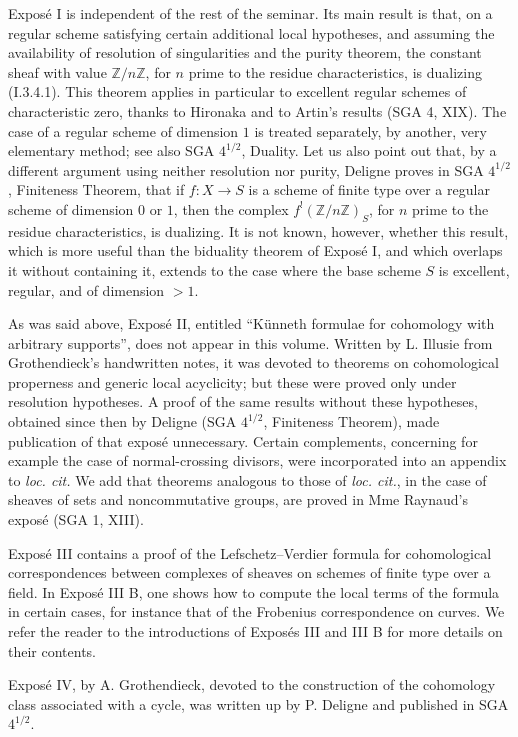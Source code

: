 \documentclass[11pt]{article}
\theoremstyle{plain}
\theoremstyle{definition}
\theoremstyle{remark}
\newcommand{\Z}{\mathbb Z}\newcommand{\Q}{\mathbb Q}\newcommand{\N}{\mathbb N}\newcommand{\A}{\mathbb A}\newcommand{\Pp}{\mathbb P}
\begin{document}
Exposé I is independent of the rest of the seminar. Its main result is that, on a regular scheme satisfying certain additional local hypotheses, and assuming the availability of resolution of singularities and the purity theorem, the constant sheaf with value $\Z/n\Z$, for $n$ prime to the residue characteristics, is dualizing (I.3.4.1). This theorem applies in particular to excellent regular schemes of characteristic zero, thanks to Hironaka and to Artin's results (SGA 4, XIX). The case of a regular scheme of dimension $1$ is treated separately, by another, very elementary method; see also SGA $4^{1/2}$, Duality. Let us also point out that, by a different argument using neither resolution nor purity, Deligne proves in SGA $4^{1/2}$, Finiteness Theorem, that if $f:X\to S$ is a scheme of finite type over a regular scheme of dimension $0$ or $1$, then the complex $f^!(\Z/n\Z)_S$, for $n$ prime to the residue characteristics, is dualizing. It is not known, however, whether this result, which is more useful than the biduality theorem of Exposé I, and which overlaps it without containing it, extends to the case where the base scheme $S$ is excellent, regular, and of dimension $>1$.

As was said above, Exposé II, entitled ``Künneth formulae for cohomology with arbitrary supports'', does not appear in this volume. Written by L. Illusie from Grothendieck's handwritten notes, it was devoted to theorems on cohomological properness and generic local acyclicity; but these were proved only under resolution hypotheses. A proof of the same results without these hypotheses, obtained since then by Deligne (SGA $4^{1/2}$, Finiteness Theorem), made publication of that exposé unnecessary. Certain complements, concerning for example the case of normal-crossing divisors, were incorporated into an appendix to \emph{loc. cit.} We add that theorems analogous to those of \emph{loc. cit.}, in the case of sheaves of sets and noncommutative groups, are proved in Mme Raynaud's exposé (SGA 1, XIII).

Exposé III contains a proof of the Lefschetz--Verdier formula for cohomological correspondences between complexes of sheaves on schemes of finite type over a field. In Exposé III B, one shows how to compute the local terms of the formula in certain cases, for instance that of the Frobenius correspondence on curves. We refer the reader to the introductions of Exposés III and III B for more details on their contents.

Exposé IV, by A. Grothendieck, devoted to the construction of the cohomology class associated with a cycle, was written up by P. Deligne and published in SGA $4^{1/2}$.
\end{document}
